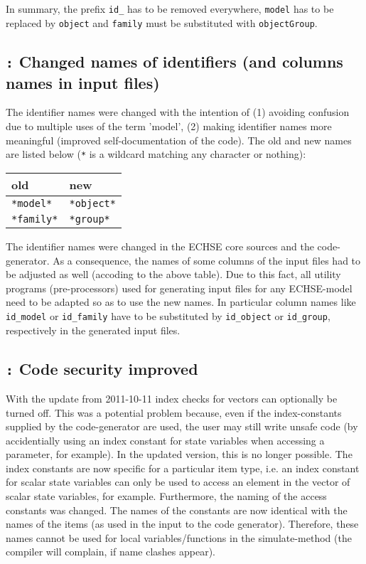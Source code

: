 \documentclass[a4paper,10pt]{article}
\newcommand{\logentry}[2]{\subsection*{\texttt{\color{red}{#1}:} \large{\textbf{#2}}}}
\begin{document}
\medskip
In summary, the prefix \verb!id_! has to be removed everywhere, \verb!model! has to be replaced by \verb!object! and \verb!family! must be substituted with \verb!objectGroup!.

\logentry{2011-11-08}{Changed names of identifiers (and columns names in input files)}
The identifier names were changed with the intention of (1) avoiding confusion due to multiple uses of the term 'model', (2) making identifier names more meaningful (improved self-documentation of the code). The old and new names are listed below (\verb!*! is a wildcard matching any character or nothing):

\medskip
\begin{tabular}{ll} \hline
  \textbf{old} & \textbf{new} \\ \hline
  \verb!*model*! & \verb!*object*! \\
  \verb!*family*! & \verb!*group*! \\ \hline
\end{tabular}

\medskip
The identifier names were changed in the ECHSE core sources and the code-generator. As a consequence, the names of some columns of the input files had to be adjusted as well (accoding to the above table). Due to this fact, all utility programs (pre-processors) used for generating input files for any ECHSE-model need to be adapted so as to use the new names. In particular column names like \verb!id_model! or \verb!id_family! have to be substituted by \verb!id_object! or \verb!id_group!, respectively in the generated input files.

\logentry{2011-10-27}{Code security improved} With the update from 2011-10-11 index checks for vectors can optionally be turned off. This was a potential problem because, even if the index-constants supplied by the code-generator are used, the user may still write unsafe code (by accidentially using an index constant for state variables when accessing a parameter, for example). In the updated version, this is no longer possible. The index constants are now specific for a particular item type, i.e. an index constant for scalar state variables can only be used to access an element in the vector of scalar state variables, for example.
Furthermore, the naming of the access constants was changed. The names of the constants are now identical with the names of the items (as used in the input to the code generator). Therefore, these names cannot be used for local variables/functions in the simulate-method (the compiler will complain, if name clashes appear).
\end{document}
